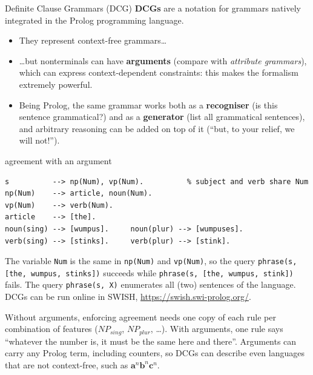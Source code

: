 \begin{nbdef}{Definite Clause Grammars (DCG)}
\textbf{DCGs} are a notation for grammars natively integrated in the Prolog programming
language.
\begin{itemize}[nosep]
  \item They represent context-free grammars\ldots
  \item \ldots but nonterminals can have \textbf{arguments} (compare with \emph{attribute
        grammars}), which can express context-dependent constraints: this makes the
        formalism extremely powerful.
  \item Being Prolog, the same grammar works both as a \textbf{recogniser} (is this
        sentence grammatical?) and as a \textbf{generator} (list all grammatical
        sentences), and arbitrary reasoning can be added on top of it (``but, to your
        relief, we will not!'').
\end{itemize}
\end{nbdef}

\begin{nbexample}{agreement with an argument}
\begin{verbatim}
s          --> np(Num), vp(Num).          % subject and verb share Num
np(Num)    --> article, noun(Num).
vp(Num)    --> verb(Num).
article    --> [the].
noun(sing) --> [wumpus].     noun(plur) --> [wumpuses].
verb(sing) --> [stinks].     verb(plur) --> [stink].
\end{verbatim}
The variable \texttt{Num} is the same in \texttt{np(Num)} and \texttt{vp(Num)}, so the
query \texttt{phrase(s, [the, wumpus, stinks])} succeeds while \texttt{phrase(s, [the,
wumpus, stink])} fails. The query \texttt{phrase(s, X)} enumerates all (two) sentences of
the language. DCGs can be run online in SWISH, \url{https://swish.swi-prolog.org/}.
\end{nbexample}

\begin{nbintuition}
Without arguments, enforcing agreement needs one copy of each rule per combination of
features ($NP_{sing}$, $NP_{plur}$, \ldots). With arguments, one rule says ``whatever the
number is, it must be the same here and there''. Arguments can carry any Prolog term,
including counters, so DCGs can describe even languages that are not context-free, such
as $\mathbf{a}^n\mathbf{b}^n\mathbf{c}^n$.
\end{nbintuition}
